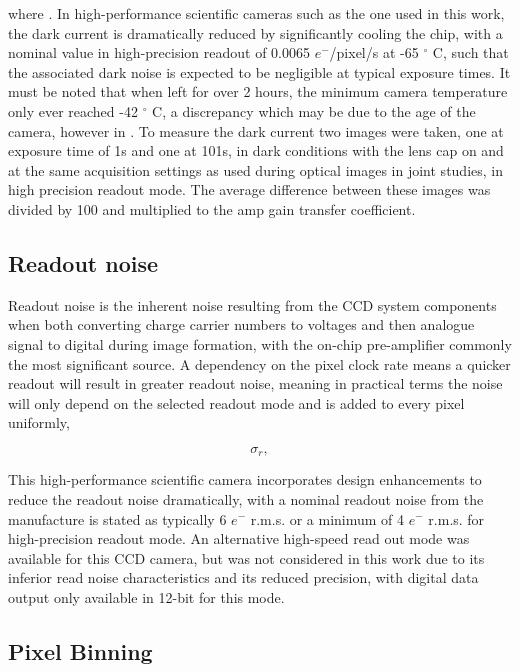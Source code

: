\documentclass[twoside]{bhamthesis}
\theoremstyle{definition}
\begin{document}
where . In high-performance scientific cameras such as the one used in this work, the dark current is dramatically reduced by significantly cooling the chip, with a nominal value in high-precision readout of 0.0065 $e^-$/pixel/s at -65 $^\circ$ C, such that the associated dark noise is expected to be negligible at typical exposure times. It must be noted that when left for over 2 hours, the minimum camera temperature only ever reached -42 $^\circ$ C, a discrepancy which may be due to the age of the camera, however in . To measure the dark current two images were taken, one at exposure time of 1s and one at 101s, in dark conditions with the lens cap on and at the same acquisition settings as used during optical images in joint studies, in high precision readout mode. The average difference between these images was divided by 100 and multiplied to the amp gain transfer coefficient. 

\subsection{Readout noise}

Readout noise is the inherent noise resulting from the CCD system components when both converting charge carrier numbers to voltages and then analogue signal to digital during image formation, with the on-chip pre-amplifier commonly the most significant source. A dependency on the pixel clock rate means a quicker readout will result in greater readout noise, meaning in practical terms the noise will only depend on the selected readout mode and is added to every pixel uniformly, 

\begin{equation}
{ \sigma_r } ,
  \label{eqn:dark_noise}
\end{equation}

This high-performance scientific camera incorporates design enhancements to reduce the readout noise dramatically, with a nominal readout noise from the manufacture is stated as typically 6 $e^-$ r.m.s. or a minimum of 4 $e^-$ r.m.s. for high-precision readout mode. An alternative high-speed read out mode was available for this CCD camera, but was not considered in this work due to its inferior read noise characteristics and its reduced precision, with digital data output only available in 12-bit for this mode.

\subsection{Pixel Binning}
\label{appendix:Pixel_binning}
\end{document}
